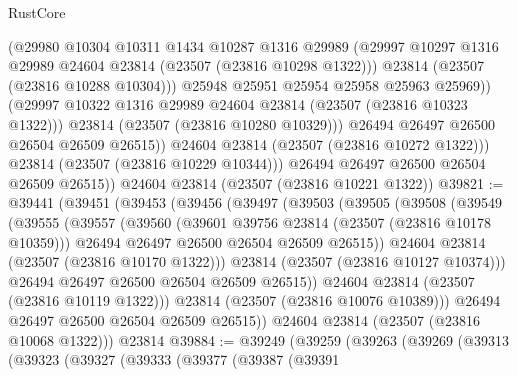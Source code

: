 \begin{lexlean}{RustCore}
\begin{coremodule}
                      (@29980
                        @10304
                        @10311
                        @1434
                        @10287
                        @1316
                        @29989
                        (@29997 @10297 @1316 @29989 @24604 @23814 (@23507 (@23816 @10298 @1322)))
                        @23814
                        (@23507 (@23816 @10288 @10304)))
                      @25948
                      @25951
                      @25954
                      @25958
                      @25963
                      @25969))
                  (@29997 @10322 @1316 @29989 @24604 @23814 (@23507 (@23816 @10323 @1322)))
                  @23814
                  (@23507 (@23816 @10280 @10329)))
                @26494
                @26497
                @26500
                @26504
                @26509
                @26515))
            @24604
            @23814
            (@23507 (@23816 @10272 @1322)))
          @23814
          (@23507 (@23816 @10229 @10344)))
        @26494
        @26497
        @26500
        @26504
        @26509
        @26515))
    @24604
    @23814
    (@23507 (@23816 @10221 @1322))
@39821 := @39441
    (@39451
      (@39453
        (@39456
          (@39497
            (@39503
              (@39505
                (@39508
                  (@39549
                    (@39555
                      (@39557
                        (@39560
                          (@39601 @39756 @23814 (@23507 (@23816 @10178 @10359)))
                          @26494
                          @26497
                          @26500
                          @26504
                          @26509
                          @26515))
                      @24604
                      @23814
                      (@23507 (@23816 @10170 @1322)))
                    @23814
                    (@23507 (@23816 @10127 @10374)))
                  @26494
                  @26497
                  @26500
                  @26504
                  @26509
                  @26515))
              @24604
              @23814
              (@23507 (@23816 @10119 @1322)))
            @23814
            (@23507 (@23816 @10076 @10389)))
          @26494
          @26497
          @26500
          @26504
          @26509
          @26515))
      @24604
      @23814
      (@23507 (@23816 @10068 @1322)))
    @23814
@39884 := @39249
    (@39259
      (@39263
        (@39269
          (@39313
            (@39323
              (@39327
                (@39333
                  (@39377
                    (@39387
                      (@39391

\end{coremodule}
\end{lexlean}

